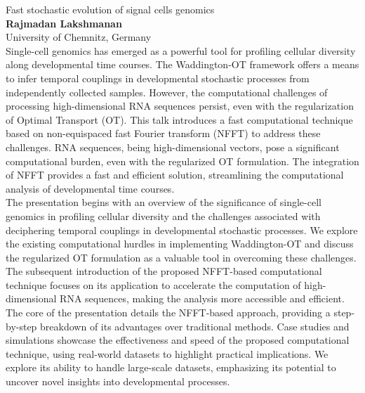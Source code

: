 \documentclass[12pt,a4paper]{article}
\begin{document}
\bigskip \bigskip  %
\newpage


\noindent
{\Large Fast stochastic evolution of signal cells genomics}\\[1ex]
{\large 
\textbf{Rajmadan Lakshmanan}\\[1ex] University of Chemnitz, Germany}\\[2ex]
Single-cell genomics has emerged as a powerful tool for profiling cellular diversity along developmental time courses. The Waddington-OT framework offers a means to infer temporal couplings in developmental stochastic processes from independently collected samples. However, the computational challenges of processing high-dimensional RNA sequences persist, even with the regularization of Optimal Transport (OT). This talk introduces a fast computational technique based on non-equispaced fast Fourier transform (NFFT) to address these challenges. RNA sequences, being high-dimensional vectors, pose a significant computational burden, even with the regularized OT formulation. The integration of NFFT provides a fast and efficient solution, streamlining the computational analysis of developmental time courses.
\\
The presentation begins with an overview of the significance of single-cell genomics in profiling cellular diversity and the challenges associated with deciphering temporal couplings in developmental stochastic processes. We explore the existing computational hurdles in implementing Waddington-OT and discuss the regularized OT formulation as a valuable tool in overcoming these challenges. The subsequent introduction of the proposed NFFT-based computational technique focuses on its application to accelerate the computation of high-dimensional RNA sequences, making the analysis more accessible and efficient.
\\
The core of the presentation details the NFFT-based approach, providing a step-by-step breakdown of its advantages over traditional methods. Case studies and simulations showcase the effectiveness and speed of the proposed computational technique, using real-world datasets to highlight practical implications. We explore its ability to handle large-scale datasets, emphasizing its potential to uncover novel insights into developmental processes. 
\end{document}
